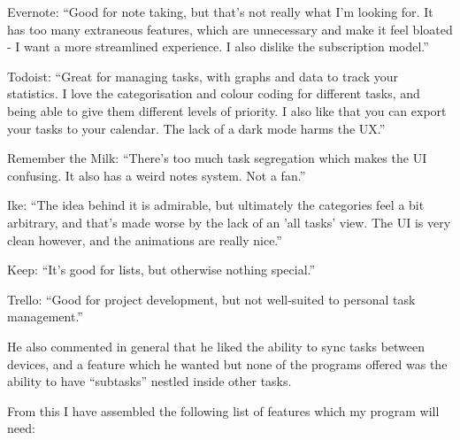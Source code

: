 \documentclass[]{article}
\begin{document}
Evernote: ``Good for note taking, but that's not really what I'm looking
for. It has too many extraneous features, which are unnecessary and make
it feel bloated - I want a more streamlined experience. I also dislike
the subscription model.''

Todoist: ``Great for managing tasks, with graphs and data to track your
statistics. I love the categorisation and colour coding for different
tasks, and being able to give them different levels of priority. I also
like that you can export your tasks to your calendar. The lack of a dark
mode harms the UX.''

Remember the Milk: ``There's too much task segregation which makes the
UI confusing. It also has a weird notes system. Not a fan.''

Ike: ``The idea behind it is admirable, but ultimately the categories
feel a bit arbitrary, and that's made worse by the lack of an 'all
tasks' view. The UI is very clean however, and the animations are really
nice.''

Keep: ``It's good for lists, but otherwise nothing special.''

Trello: ``Good for project development, but not well-suited to personal
task management.''

He also commented in general that he liked the ability to sync tasks
between devices, and a feature which he wanted but none of the programs
offered was the ability to have ``subtasks'' nestled inside other tasks.

From this I have assembled the following list of features which my
program will need:
\end{document}

